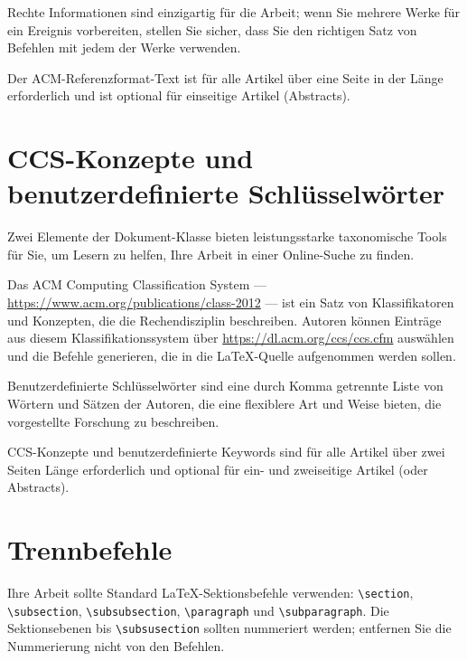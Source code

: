 \documentclass[manuscript,screen,review]{acmart}
\begin{document}
Rechte Informationen sind einzigartig für die Arbeit; wenn Sie mehrere Werke für ein Ereignis vorbereiten, stellen Sie sicher, dass Sie den richtigen Satz von Befehlen mit jedem der Werke verwenden.

Der ACM-Referenzformat-Text ist für alle Artikel über eine Seite in der Länge erforderlich und ist optional für einseitige Artikel (Abstracts).

\section{CCS-Konzepte und benutzerdefinierte Schlüsselwörter}

Zwei Elemente der Dokument-Klasse bieten leistungsstarke taxonomische Tools für Sie, um Lesern zu helfen, Ihre Arbeit in einer Online-Suche zu finden.

Das ACM Computing Classification System — \url{https://www.acm.org/publications/class-2012} — ist ein Satz von Klassifikatoren und Konzepten, die die Rechendisziplin beschreiben. Autoren können Einträge aus diesem Klassifikationssystem über \url{https://dl.acm.org/ccs/ccs.cfm} auswählen und die Befehle generieren, die in die \LaTeX-Quelle aufgenommen werden sollen.

Benutzerdefinierte Schlüsselwörter sind eine durch Komma getrennte Liste von Wörtern und Sätzen der Autoren, die eine flexiblere Art und Weise bieten, die vorgestellte Forschung zu beschreiben.

CCS-Konzepte und benutzerdefinierte Keywords sind für alle Artikel über zwei Seiten Länge erforderlich und optional für ein- und zweiseitige Artikel (oder Abstracts).

\section{Trennbefehle}

Ihre Arbeit sollte Standard \LaTeX-Sektionsbefehle verwenden: \verb|\section|, \verb|\subsection|, \verb|\subsubsection|, \verb|\paragraph| und \verb|\subparagraph|. Die Sektionsebenen bis \verb|\subsusection| sollten nummeriert werden; entfernen Sie die Nummerierung nicht von den Befehlen.
\end{document}
